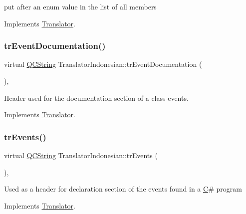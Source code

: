 put after an enum value in the list of all members 

Implements \mbox{\hyperlink{class_translator}{Translator}}.

\mbox{\label{class_translator_indonesian_a0e3a80a83b9fe7777f47db3d34cadba8}} 
\subsubsection{\texorpdfstring{trEventDocumentation()}{trEventDocumentation()}}
{\footnotesize\ttfamily virtual \mbox{\hyperlink{class_q_c_string}{Q\+C\+String}} Translator\+Indonesian\+::tr\+Event\+Documentation (\begin{DoxyParamCaption}{ }\end{DoxyParamCaption})\hspace{0.3cm}{\ttfamily [inline]}, {\ttfamily [virtual]}}

Header used for the documentation section of a class\textquotesingle{} events. 

Implements \mbox{\hyperlink{class_translator}{Translator}}.

\mbox{\label{class_translator_indonesian_a00b4918452191519042608ab27931f0e}} 
\subsubsection{\texorpdfstring{trEvents()}{trEvents()}}
{\footnotesize\ttfamily virtual \mbox{\hyperlink{class_q_c_string}{Q\+C\+String}} Translator\+Indonesian\+::tr\+Events (\begin{DoxyParamCaption}{ }\end{DoxyParamCaption})\hspace{0.3cm}{\ttfamily [inline]}, {\ttfamily [virtual]}}

Used as a header for declaration section of the events found in a \mbox{\hyperlink{class_c}{C}}\# program 

Implements \mbox{\hyperlink{class_translator}{Translator}}.

\mbox{\label{class_translator_indonesian_a15bf2a6331c2bb18c87eee7f62ffeeef}} 
